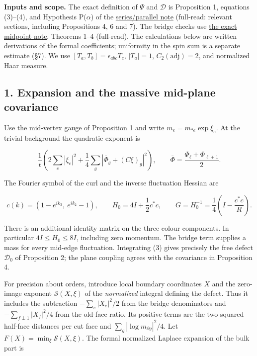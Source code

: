 \documentclass[11pt,a4paper]{article}
\begin{document}
\textbf{Inputs and scope.} The exact definition of \(\Psi\) and
\(\mathcal D\) is Proposition 1, equations (3)--(4), and Hypothesis
P(\(\alpha\)) of the
\href{series-parallel-gauge-refinement.md}{series/parallel note}
(full-read: relevant sections, including Propositions 4, 6 and 7). The
bridge checks use \href{su2-midpoint-exact.md}{the exact midpoint note},
Theorems 1--4 (full-read). The calculations below are written
derivations of the formal coefficients; uniformity in the spin sum is a
separate estimate (§7). We use \([T_a,T_b]=\epsilon_{abc}T_c\),
\(|T_a|=1\), \(C_2(\mathrm{adj})=2\), and normalized Haar measure.

\hypertarget{expansion-and-the-massive-mid-plane-covariance}{%
\subsection{1. Expansion and the massive mid-plane
covariance}\label{expansion-and-the-massive-mid-plane-covariance}}

Use the mid-vertex gauge of Proposition 1 and write
\(m_e=m_{*e}\exp\xi_e\). At the trivial background the quadratic
exponent is

\[\frac1t\left(2\sum_e|\xi_e|^2
 +\frac14\sum_g|\bar\Phi_g+(C\xi)_g|^2\right),\qquad
\bar\Phi=\frac{\Phi_\ell+\Phi_{\ell+1}}2.\]

The Fourier symbol of the curl and the inverse fluctuation Hessian are

\[c(k)=(1-e^{ik_3},\ e^{ik_2}-1),\qquad
H_0=4I+\frac12c^*c,\qquad
G=H_0^{-1}=\frac14\left(I-\frac{c^*c}{R}\right).\tag{3}\]

There is an additional identity matrix on the three colour components.
In particular \(4I\le H_0\le8I\), including zero momentum. The bridge
term supplies a mass for every mid-edge fluctuation. Integrating (3)
gives precisely the free defect \(\mathcal D_0\) of Proposition 2; the
plane coupling agrees with the covariance in Proposition 4.

For precision about orders, introduce local boundary coordinates \(X\)
and the zero-image exponent \(\mathcal S(X,\xi)\) of the
\emph{normalized} integral defining the defect. Thus it includes the
subtraction \(-\sum_e|X_e|^2/2\) from the bridge denominators and
\(-\sum_{f\perp1}|X_f|^2/4\) from the old-face ratio. Its positive terms
are the two squared half-face distances per cut face and
\(\sum_g|\log m_{\partial g}|^2/4\). Let
\(F(X)=\min_\xi\mathcal S(X,\xi)\). The formal normalized Laplace
expansion of the bulk part is
\end{document}
